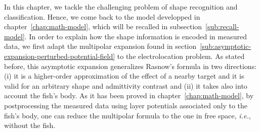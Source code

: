 % 
% 

In this chapter, we tackle the challenging problem of shape
recognition and classification. Hence, we come back to the model developped
in chapter~\ref{chap:math-model}, which will be recalled in 
subsection~\ref{sub:recall-model}. In order to explain how the shape
information is encoded in measured data, we first adapt the multipolar
expansion found in section~\ref{sub:asymptotic-expansion-perturbed-potential-field} to the electrolocation problem.
As stated before, this asymptotic expansion generalizes Rasnow's formula
\cite{rasnowformula} in two directions: (i) it is a higher-order
approximation of the effect of a nearby target and it is valid for
an arbitrary shape and admittivity contrast and (ii) it takes also
into account the fish's body. As it has been proved in
chapter~\ref{chap:math-model}, by postprocessing the measured data using layer
potentials associated only to the fish's body, one can reduce the
multipolar formula to the one in free space, {\it i.e.}, without
the fish.

